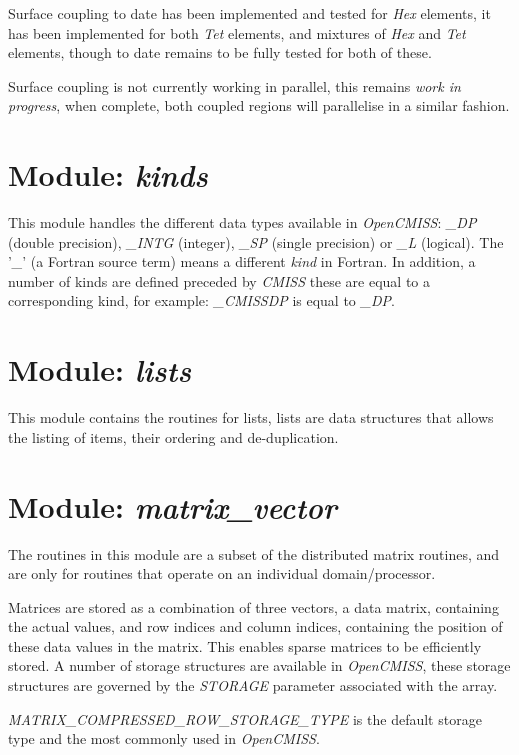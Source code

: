 Surface coupling to date has been implemented and tested for \emph{Hex} 
elements, it has been implemented for both \emph{Tet} elements, and mixtures 
of \emph{Hex} and \emph{Tet} elements, though to date remains to be fully 
tested for both of these.

Surface coupling is not currently working in parallel, this remains 
\emph{work in progress}, when complete, both coupled regions will 
parallelise in a similar fashion.


\section{Module: \emph{kinds}}
\label{sec:kinds}

This module handles the different data types available in \emph{OpenCMISS}: 
\emph{\_DP} (double precision), \emph{\_INTG} (integer), \emph{\_SP} (single 
precision) or \emph{\_L} (logical). The '\emph{\_}' (a Fortran source term) 
means a different \emph{kind} in Fortran. In addition, a number of kinds 
are defined preceded by \emph{CMISS} these are equal to a corresponding 
kind, for example: \emph{\_CMISSDP} is equal to \emph{\_DP}. 


\section{Module: \emph{lists}}
\label{sec:lists}

This module contains the routines for lists, lists are data structures that 
allows the listing of items, their ordering and de-duplication.


\section{Module: \emph{matrix\_vector}}
\label{sec:matrixvector}

The routines in this module are a subset of the distributed matrix routines, 
and are only for routines that operate on an individual domain/processor.

Matrices are stored as a combination of three vectors, a data matrix, 
containing the actual values, and row indices and column indices, containing 
the position of these data values in the matrix. This enables sparse matrices 
to be efficiently stored. A number of storage structures are available in 
\emph{OpenCMISS}, these storage structures are governed by the \emph{STORAGE} 
parameter associated with the array. 

\emph{MATRIX\_COMPRESSED\_ROW\_STORAGE\_TYPE} is the default storage type 
and the most commonly used in \emph{OpenCMISS}.


